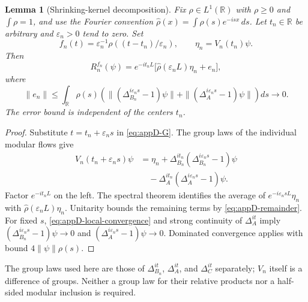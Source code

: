 \documentclass[a4paper,11pt]{article}
\newtheorem{lemma}[theorem]{Lemma}
\theoremstyle{definition}
\begin{document}
\begin{lemma}[Shrinking-kernel decomposition]
\label{lem:appD-decomposition}
Fix $\rho\in L^1(\mathbb R)$ with $\rho\ge0$ and $\int\rho=1$, and use the Fourier convention
$\widehat\rho(x)=\int\rho(s)e^{-isx}\,ds$.
Let $t_n\in\mathbb R$ be arbitrary and $\varepsilon_n>0$ tend to zero. Set
\begin{equation}
 f_n(t)=\varepsilon_n^{-1}\rho((t-t_n)/\varepsilon_n),
 \qquad \eta_n=V_n(t_n)\psi.
 \label{eq:appD-kernels}
\end{equation}
Then
\begin{equation}
 R_n^{f_n}(\psi)
 =e^{-it_nL}\bigl[\widehat\rho(\varepsilon_nL)\eta_n+e_n\bigr],
 \label{eq:appD-decomposition}
\end{equation}
where
\begin{equation}
 \|e_n\|\le
 \int_{\mathbb R}\rho(s)
 \left(\|(\Delta_{B_n}^{i\varepsilon_ns}-1)\psi\|
       +\|(\Delta_A^{i\varepsilon_ns}-1)\psi\|\right)ds
 \longrightarrow0 .
 \label{eq:appD-remainder}
\end{equation}
The error bound is independent of the centers $t_n$.
\end{lemma}
\begin{proof}
Substitute $t=t_n+\varepsilon_ns$ in \eqref{eq:appD-G}. The group laws of the individual modular flows give
\begin{align*}
 V_n(t_n+\varepsilon_ns)\psi
 &=\eta_n+\Delta_{B_n}^{it_n}(\Delta_{B_n}^{i\varepsilon_ns}-1)\psi\\
 &\quad-\Delta_A^{it_n}(\Delta_A^{i\varepsilon_ns}-1)\psi .
\end{align*}
Factor $e^{-it_nL}$ on the left. The spectral theorem identifies the average of $e^{-i\varepsilon_nsL}\eta_n$ with
$\widehat\rho(\varepsilon_nL)\eta_n$.
Unitarity bounds the remaining terms by \eqref{eq:appD-remainder}.
For fixed $s$, \eqref{eq:appD-local-convergence} and strong continuity of $\Delta_A^{it}$ imply
$(\Delta_{B_n}^{i\varepsilon_ns}-1)\psi\to0$ and $(\Delta_A^{i\varepsilon_ns}-1)\psi\to0$.
Dominated convergence applies with bound $4\|\psi\|\rho(s)$.
\end{proof}

The group laws used here are those of $\Delta_{B_n}^{it}$, $\Delta_A^{it}$, and $\Delta_C^{it}$ separately; $V_n$ itself is a difference of groups. Neither a group law for their relative products nor a half-sided modular inclusion is required.
\end{document}
